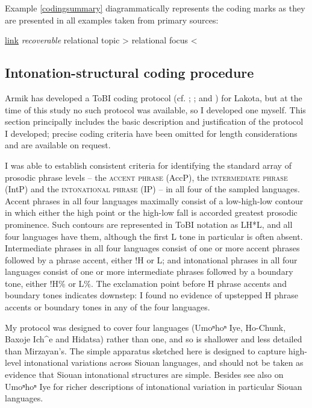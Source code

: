\documentclass[output=paper]{LSP/langsci}
\begin{document}
Example \ref{codingsummary} diagrammatically represents the coding marks as they are presented in all examples taken from primary sources:

\ea\label{codingsummary}{\underline{link} \textit{recoverable} relational topic > relational focus <}\z

\subsection{Intonation-structural coding procedure}\label{intonationcoding}

Armik \citet{Mirzayan2011} has developed a ToBI coding protocol (cf. \citealt{Pierrehumbert1980}; \citealt{BeckmanPierrehumbert1986}; and \citealt{PierrehumbertHirschberg1990}) for Lakota, but at the time of this study no such protocol was available, so I developed one myself. This section principally includes the basic description and justification of the protocol I developed; precise coding criteria have been omitted for length considerations and are available on request. 

I was able to establish consistent criteria for identifying the standard array of prosodic phrase levels -- the \textsc{accent phrase} (AccP), the \textsc{intermediate phrase} (IntP) and the \textsc{intonational phrase} (IP) -- in all four of the sampled languages. Accent phrases in all four languages maximally consist of a low-high-low contour in which either the high point or the high-low fall is accorded greatest prosodic prominence. Such contours are represented in ToBI notation as LH*L, and all four languages have them, although the first L tone in particular is often absent. Intermediate phrases in all four languages consist of one or more accent phrases followed by a phrase accent, either !H or L; and intonational phrases in all four languages consist of one or more intermediate phrases followed by a boundary tone, either !H\% or L\%. The exclamation point before H phrase accents and boundary tones indicates downstep: I found no evidence of upstepped H phrase accents or boundary tones in any of the four languages. 

My protocol was designed to cover four languages (Umoⁿhoⁿ Iye, Ho-Chunk, Baxoje Ich\^{}e and Hidatsa) rather than one, and so is shallower and less detailed than Mirzayan’s. The simple apparatus sketched here is designed to capture high-level intonational variations across Siouan languages, and should not be taken as evidence that Siouan intonational structures are simple. Besides \citet{Mirzayan2011} see also \citet{Larson2009} on Umoⁿhoⁿ Iye for richer descriptions of intonational variation in particular Siouan languages. 
\end{document}
